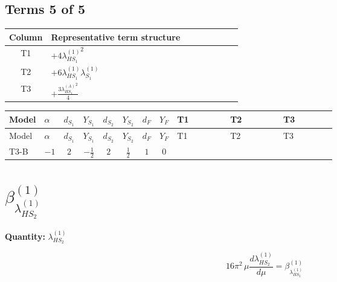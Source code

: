 \documentclass[8pt]{article}
\begin{document}
\begin{landscape}
\subsection*{Terms 5 of 5}
\begin{center}
\begin{tabular}{@{}c >{\raggedright\arraybackslash}p{0.82\linewidth}@{}}
\toprule
Column & Representative term structure \\
\midrule
T1 & \(\displaystyle +4 {\lambda_{HS_1}^{(1)}}^2\) \\
\midrule
T2 & \(\displaystyle +6 {\lambda_{HS_1}^{(1)}} {\lambda_{S_1}^{(1)}}\) \\
\midrule
T3 & \(\displaystyle +\frac{3 {\lambda_{HS_1}^{(A)}}^2}{4}\) \\
\midrule
\bottomrule
\end{tabular}
\end{center}
\smallskip
\tiny
\begin{longtable}{@{}llcccccc >{\raggedright\arraybackslash}p{0.21\linewidth} >{\raggedright\arraybackslash}p{0.21\linewidth} >{\raggedright\arraybackslash}p{0.21\linewidth}@{}}
\toprule
Model & $\alpha$ & $d_{S_1}$ & $Y_{S_1}$ & $d_{S_2}$ & $Y_{S_2}$ & $d_F$ & $Y_F$ & T1 & T2 & T3 \\
\midrule
\endfirsthead
\toprule
Model & $\alpha$ & $d_{S_1}$ & $Y_{S_1}$ & $d_{S_2}$ & $Y_{S_2}$ & $d_F$ & $Y_F$ & T1 & T2 & T3 \\
\midrule
\endhead
T3-B & $-1$ & $2$ & $-\frac{1}{2}$ & $2$ & $\frac{1}{2}$ & $1$ & $0$ & \scriptsize\adjustbox{max width=\linewidth}{$\begin{gathered} +4 {\lambda_{HS_1}^{(1)}}^2\end{gathered}$} & \scriptsize\adjustbox{max width=\linewidth}{$\begin{gathered} +6 {\lambda_{HS_1}^{(1)}} {\lambda_{S_1}^{(1)}}\end{gathered}$} & \scriptsize\adjustbox{max width=\linewidth}{$\begin{gathered} +\frac{3 {\lambda_{HS_1}^{(A)}}^2}{4}\end{gathered}$} \\
\midrule
\bottomrule
\end{longtable}
\clearpage
\section*{$\beta_{\lambda_{HS_2}^{(1)}}^{(1)}$}
\noindent\textbf{Quantity: }$\lambda_{HS_2}^{(1)}$\par\smallskip
\[16\pi^2\,\mu\frac{d \lambda_{HS_2}^{(1)}}{d\mu}=\beta_{\lambda_{HS_2}^{(1)}}^{(1)}\]

\end{landscape}
\end{document}
